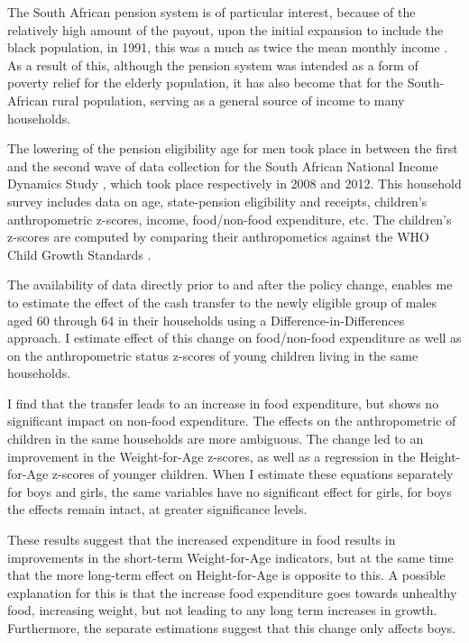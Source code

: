 \documentclass[a4paper,british]{article}\usepackage[]{graphicx}\usepackage[]{color}
\begin{document}
The South African pension system is of particular interest, because
of the relatively high amount of the payout, upon the initial expansion
to include the black population, in 1991, this was a much as twice
the mean monthly income \citep*[see][]{tangwe2013impact}. As a result
of this, although the pension system was intended as a form of poverty
relief for the elderly population, it has also become that for the
South-African rural population, serving as a general source of income
to many households.

The lowering of the pension eligibility age for men took place in
between the first and the second wave of data collection for the South
African National Income Dynamics Study \citep{saldru2008nids,saldru2012nids,saldru2013nids},
which took place respectively in 2008 and 2012. This household survey
includes data on age, state-pension eligibility and receipts, children's
anthropometric z-scores, income, food/non-food expenditure, etc. The
children's z-scores are computed by comparing their anthropometics
against the WHO Child Growth Standards \citep{who2006child}.

The availability of data directly prior to and after the policy change,
enables me to estimate the effect of the cash transfer to the newly
eligible group of males aged 60 through 64 in their households using
a Difference-in-Differences approach. I estimate effect of this change
on food/non-food expenditure as well as on the anthropometric status
z-scores of young children living in the same households.

I find that the transfer leads to an increase in food expenditure,
but shows no significant impact on non-food expenditure. The effects
on the anthropometric of children in the same households are more
ambiguous. The change led to an improvement in the Weight-for-Age
z-scores, as well as a regression in the Height-for-Age z-scores of
younger children. When I estimate these equations separately for boys
and girls, the same variables have no significant effect for girls,
for boys the effects remain intact, at greater significance levels.

These results suggest that the increased expenditure in food results
in improvements in the short-term Weight-for-Age indicators, but at
the same time that the more long-term effect on Height-for-Age is
opposite to this. A possible explanation for this is that the increase
food expenditure goes towards unhealthy food, increasing weight, but
not leading to any long term increases in growth. Furthermore, the
separate estimations suggest that this change only affects boys.
\end{document}
